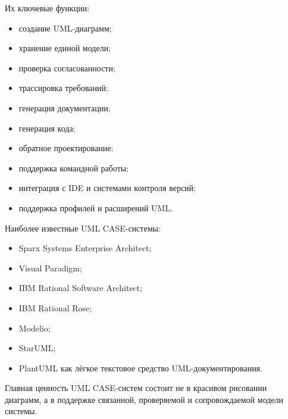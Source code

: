 \documentclass[12pt,a4paper]{article}
\begin{document}
Их ключевые функции:
\begin{itemize}
    \item создание UML-диаграмм;
    \item хранение единой модели;
    \item проверка согласованности;
    \item трассировка требований;
    \item генерация документации;
    \item генерация кода;
    \item обратное проектирование;
    \item поддержка командной работы;
    \item интеграция с IDE и системами контроля версий;
    \item поддержка профилей и расширений UML.
\end{itemize}

Наиболее известные UML CASE-системы:
\begin{itemize}
    \item Sparx Systems Enterprise Architect;
    \item Visual Paradigm;
    \item IBM Rational Software Architect;
    \item IBM Rational Rose;
    \item Modelio;
    \item StarUML;
    \item PlantUML как лёгкое текстовое средство UML-документирования.
\end{itemize}

Главная ценность UML CASE-систем состоит не в красивом рисовании диаграмм, а в поддержке связанной, проверяемой и сопровождаемой модели системы.
\end{document}

